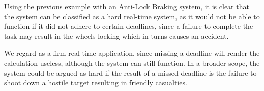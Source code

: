 Using the previous example with an Anti-Lock Braking system, it is clear that
the system can be classified as a hard real-time system, as it would not be able
to function if it did not adhere to certain deadlines, since a failure to complete the task may result
in the wheels locking which in turns causes an accident.\nl

We regard \name as a firm real-time application, since missing a deadline
will render the calculation useless, although the system can still function. In
a broader scope, the system could be argued as hard if the result of a missed
deadline is the failure to shoot down a hostile target resulting in friendly
casualties.\nl


% 





